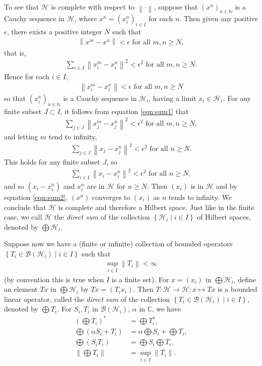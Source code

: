 \documentclass[11pt,a4paper]{report}
\theoremstyle{plain}
\theoremstyle{definition}
\newcommand{\1}{\mathbbm{1}}
\newcommand{\C}{\mathbb{C}}
\newcommand{\N}{\mathbb{N}}
\renewcommand{\H}{\mathcal{H}}
\newcommand{\B}{\mathcal{B}}
\renewcommand{\oplus}{\textstyle\bigoplus}
\begin{document}
To see that $\H$ is complete with respect to $\left\|\cdot\right\|$, suppose 
that $(x^{n})_{n\in\N}$ is a Cauchy sequence in $\H$, where $x^{n} = 
(x^n_i)_{i\in I}$ for each $n$. Then given any positive $\epsilon$, there exists 
a positive integer $N$ such that
\begin{align*}
	\left\|x^m-x^n\right\| < \epsilon \mbox{ for all } m,n\geq N,
\end{align*}
that is,
\begin{align}\label{eqn:sum1}
	\sum_{i\in I}{\left\|x^m_i-x^n_i\right\|^2} < \epsilon^2 \mbox{ for all } m,n\geq N.
\end{align}
Hence for each $i\in I$,
\begin{align*}
	\left\|x^m_i-x^n_i\right\| < \epsilon \mbox{ for all } m,n\geq N
\end{align*}
so that $(x^n_i)_{n\in\N}$ is a Cauchy sequence in $\H_i$, having a limit $x_i\in\H_i$.
For any finite subset $J\subset I$, it follows from equation \eqref{eqn:sum1} that 
\begin{align*}
	\sum_{j\in J}{\left\|x^m_j-x^n_j\right\|^2} < \epsilon^2  \mbox{ for all } m,n\geq N,
\end{align*}
and letting $m$ tend to infinity,
\begin{align}\label{eqn:sum2}
	\sum_{j\in J}{\left\|x_j-x^n_j\right\|^2} < \epsilon^2  \mbox{ for all } n\geq N.
\end{align}
This holds for any finite subset $J$, so
\begin{align*}
	\sum_{i\in I}{\left\|x_i-x^n_i\right\|^2} < \epsilon^2  \mbox{ for all } n\geq N,
\end{align*}
and so $(x_i-x^n_i)$ and $x^n_i$ are in $\H$ for $n\geq N$. Then $(x_i)$ is in 
$\H$ and by equation \eqref{eqn:sum2}, $(x^n)$ converges to $(x_i)$ as $n$ tends to 
infinity. We conclude that $\H$ is complete and therefore a Hilbert space. Just 
like in the finite case, we call $\H$ the \emph{direct sum} of the collection 
$\left\{\H_i \mid i\in I\right\}$ of Hilbert spaces, denoted by $\oplus\H_i$.


Suppose now we have a (finite or infinite) collection of bounded operators 
$\left\{T_i\in \B{(\H_i)} \mid i\in I\right\}$ such that
\begin{align*}
	\sup_{i\in I} {\left\|T_i\right\|} < \infty
\end{align*} 
(by convention this is true when $I$ is a finite set).
For $x=(x_i)$ in $\oplus\H_i$, define an element $Tx$ in $\oplus\H_i$ by 
$Tx=(T_ix_i)$. Then $T:\H\to\H:x\mapsto Tx$ is a bounded linear operator, called 
the \emph{direct sum} of the collection $\left\{T_i\in\B{(\H_i)} \mid i \in 
I\right\}$, denoted by $\oplus T_i$. For $S_i,T_i$ in $\B(\H_i)$, $\alpha$ in 
$\C$, we have 
\begin{align*}
		\left(\oplus T_i\right)^\ast &= \oplus T_i^\ast,										\\
		\oplus (\alpha S_i+ T_i) &= 
					\alpha \oplus S_i + \oplus T_i, 											\\
		\oplus (S_i T_i) &= \oplus S_i \oplus T_i,												\\
		\left\|\oplus T_i\right\| &= \sup_{i\in I} {\left\|T_i\right\|}.						\\
\end{align*}
\end{document}
